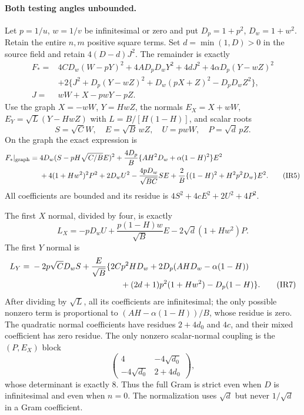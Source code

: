 \paragraph{Both testing angles unbounded.}
Let $p=1/u$, $w=1/v$ be infinitesimal or zero and put
$D_p=1+p^2$, $D_w=1+w^2$.
Retain the entire $n,m$ positive square terms. Set $d=\min(1,D)>0$ in the source
field and retain $4(D-d)J^2$. The remainder is exactly
\begin{align*}
 F_*={}&4CD_w(W-pY)^2+4AD_pD_wY^2+4dJ^2
       +4\alpha D_p(Y-wZ)^2\\
 &+2\{J^2+D_p(Y-wZ)^2+D_w(pX+Z)^2-D_pD_wZ^2\},\\
 J={}&wW+X-pwY-pZ.
\end{align*}
Use the graph $X=-wW$, $Y=HwZ$, the normals
$E_X=X+wW$, $E_Y=\sqrt L(Y-HwZ)$ with
$L=B/[H(1-H)]$, and scalar roots
\[
 S=\sqrt C W,\quad E=\sqrt B\,wZ,\quad
 U=pwW,\quad P=\sqrt d\,pZ.
\tag{IR4}
\]
On the graph the exact expression is
\begin{align*}
 F_*|_{\rm graph}={}&4D_w(S-pH\sqrt{C/B}E)^2
 +\frac{4D_p}{B}\{AH^2D_w+\alpha(1-H)^2\}E^2\\
 &+4(1+Hw^2)^2P^2+2D_wU^2
 -\frac{4pD_w}{\sqrt{BC}}SE
 +\frac2B\{(1-H)^2+H^2p^2D_w\}E^2.
\tag{IR5}
\end{align*}
All coefficients are bounded and its residue is
$4S^2+4cE^2+2U^2+4P^2$.

The first $X$ normal, divided by four, is exactly
\[
 L_X=-pD_wU+\frac{p(1-H)w}{\sqrt B}E
               -2\sqrt d(1+Hw^2)P.
\tag{IR6}
\]
The first $Y$ normal is
\begin{align*}
 L_Y={}&-2p\sqrt C D_w S+\frac{E}{\sqrt B}
 \{2Cp^2HD_w+2D_p(AHD_w-\alpha(1-H))\\
 &\hspace{38mm}+(2d+1)p^2(1+Hw^2)-D_p(1-H)\}.
\tag{IR7}
\end{align*}
After dividing by $\sqrt L$, all its coefficients are infinitesimal;
the only possible nonzero term is proportional to
$(AH-\alpha(1-H))/B$, whose residue is zero.
The quadratic normal coefficients have residues
$2+4d_0$ and $4c$, and their mixed coefficient has zero residue.
The only nonzero scalar-normal coupling is the $(P,E_X)$ block
\[
 \begin{pmatrix}4&-4\sqrt{d_0}\\-4\sqrt{d_0}&2+4d_0\end{pmatrix},
\tag{IR8}
\]
whose determinant is exactly $8$. Thus the full Gram is strict even
when $D$ is infinitesimal and even when $n=0$. The normalization uses
$\sqrt d$ but never $1/\sqrt d$ in a Gram coefficient.

